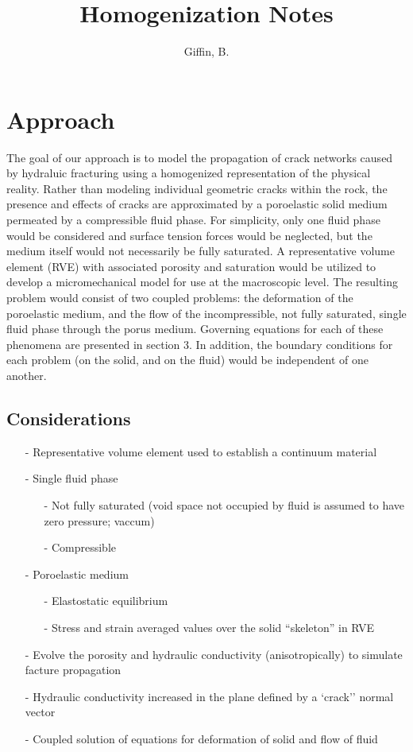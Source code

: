 \documentclass[11pt]{article} %
\title{Homogenization Notes}
\author{Giffin, B.}
\begin{document}
\maketitle

\section{Approach}

The goal of our approach is to model the propagation of crack networks caused by hydraluic fracturing using a homogenized representation of the physical reality. Rather than modeling individual geometric cracks within the rock, the presence and effects of cracks are approximated by a poroelastic solid medium permeated by a compressible fluid phase. For simplicity, only one fluid phase would be considered and surface tension forces would be neglected, but the medium itself would not necessarily be fully saturated. A representative volume element (RVE) with associated porosity and saturation would be utilized to develop a micromechanical model for use at the macroscopic level. The resulting problem would consist of two coupled problems: the deformation of the poroelastic medium, and the flow of the  incompressible, not fully saturated, single fluid phase through the porus medium. Governing equations for each of these phenomena are presented in section 3. In addition, the boundary conditions for each problem (on the solid, and on the fluid) would be independent of one another.

\subsection{Considerations}

\begin{itemize}
	\item[-] Representative volume element used to establish a continuum material
	\item[-] Single fluid phase
	\begin{itemize}
		\item[-] Not fully saturated (void space not occupied by fluid is assumed to have zero pressure; vaccum)
		\item[-] Compressible
	\end{itemize}
	\item[-] Poroelastic medium
	\begin{itemize}
		\item[-] Elastostatic equilibrium
		\item[-] Stress and strain averaged values over the solid ``skeleton'' in RVE
	\end{itemize}	
	\item[-] Evolve the porosity and hydraulic conductivity (anisotropically) to simulate facture propagation
	\item[-] Hydraulic conductivity increased in the plane defined by a `crack'' normal vector
	\item[-] Coupled solution of equations for deformation of solid and flow of fluid
\end{itemize}
\end{document}
